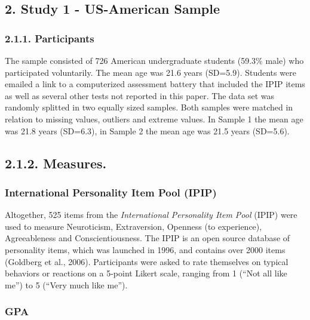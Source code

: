 \documentclass[man]{apa6}
\theoremstyle{definition}
\theoremstyle{definition}
\theoremstyle{definition}
\theoremstyle{remark}
\begin{document}
\hypertarget{study-1---us-american-sample}{%
\subsection{2. Study 1 - US-American
Sample}\label{study-1---us-american-sample}}

\hypertarget{participants}{%
\subsubsection{2.1.1. Participants}\label{participants}}

The sample consisted of 726 American undergraduate students (59.3\%
male) who participated voluntarily. The mean age was 21.6 years
(SD=5.9). Students were emailed a link to a computerized assessment
battery that included the IPIP items as well as several other tests not
reported in this paper. The data set was randomly splitted in two
equally sized samples. Both samples were matched in relation to missing
values, outliers and extreme values. In Sample 1 the mean age was 21.8
years (SD=6.3), in Sample 2 the mean age was 21.5 years (SD=5.6).

\hypertarget{measures.}{%
\subsection{2.1.2. Measures.}\label{measures.}}

\hypertarget{international-personality-item-pool-ipip}{%
\subsubsection{International Personality Item Pool
(IPIP)}\label{international-personality-item-pool-ipip}}

Altogether, 525 items from the \emph{International Personality Item
Pool} (IPIP) were used to measure Neuroticism, Extraversion, Openness
(to experience), Agreeableness and Conscientiousness. The IPIP is an
open source database of personality items, which was launched in 1996,
and contains over 2000 items (Goldberg et al., 2006). Participants were
asked to rate themselves on typical behaviors or reactions on a 5-point
Likert scale, ranging from 1 (\enquote{Not all like me}) to 5
(\enquote{Very much like me}).

\hypertarget{gpa}{%
\subsubsection{GPA}\label{gpa}}
\end{document}
